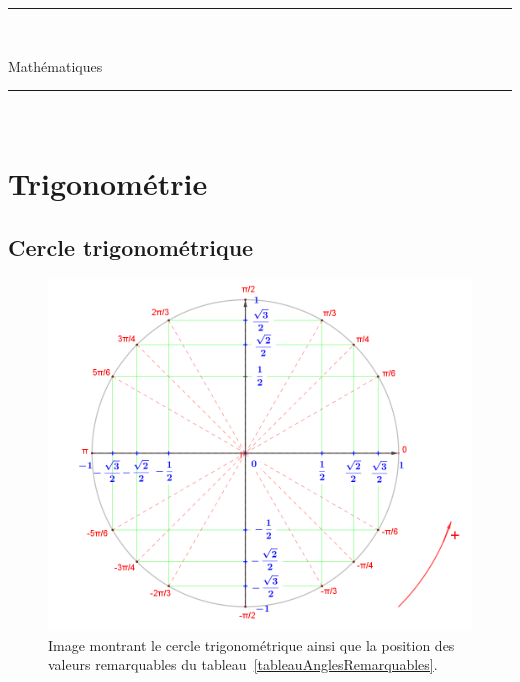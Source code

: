\documentclass[12pt,a4paper,openany]{book}
\title{}
\author{Serrurot Gabin\\
BTS SNIR}
\date{\today}
\begin{document}
\sloppy

\begin{minipage}{0.9\linewidth}
\rule{\linewidth}{0.5mm}\\[0.2cm]
\huge\bfseries
\begin{center}
Mathématiques
\end{center}
\rule{\linewidth}{0.5mm}\\[0.2cm]
\maketitle
\end{minipage}

\newpage

\tableofcontents

\newpage

\chapter{Trigonométrie}

\section{Cercle trigonométrique}

\begin{figure}[!h]
\begin{center}
\includegraphics[scale=0.5]{Images/cercleTrigonometrique.png} 
\caption{Image montrant le cercle trigonométrique ainsi que la position des valeurs remarquables du tableau~\ref{tableauAnglesRemarquables}.}
\label{cercleTrigo}
\end{center}
\end{figure}
\end{document}
